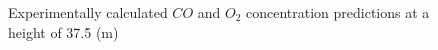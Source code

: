 \documentclass[review]{elsarticle}
\begin{document}
\begin{figure}\label{fig_comb_valid}
\centering
{}
\caption{Experimentally calculated $CO$ and $O_2$ concentration predictions at a height of 37.5 (m)}
\end{figure}
\end{document}
